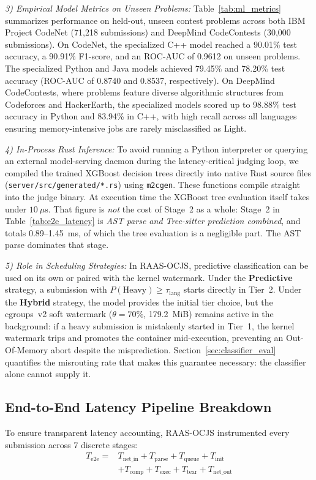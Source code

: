 \documentclass[conference]{IEEEtran}
\begin{document}
\textit{3) Empirical Model Metrics on Unseen Problems:}
Table~\ref{tab:ml_metrics} summarizes performance on held-out, unseen contest problems across both IBM Project CodeNet (71,218 submissions) and DeepMind CodeContests (30,000 submissions). On CodeNet, the specialized C++ model reached a 90.01\% test accuracy, a 90.91\% F1-score, and an ROC-AUC of 0.9612 on unseen problems. The specialized Python and Java models achieved 79.45\% and 78.20\% test accuracy (ROC-AUC of 0.8740 and 0.8537, respectively). On DeepMind CodeContests, where problems feature diverse algorithmic structures from Codeforces and HackerEarth, the specialized models scored up to 98.88\% test accuracy in Python and 83.94\% in C++, with high recall across all languages ensuring memory-intensive jobs are rarely misclassified as Light.

\textit{4) In-Process Rust Inference:}
To avoid running a Python interpreter or querying an external model-serving daemon during the latency-critical judging loop, we compiled the trained XGBoost decision trees directly into native Rust source files (\texttt{server/src/generated/*.rs}) using \texttt{m2cgen}. These functions compile straight into the judge binary. At execution time the XGBoost tree evaluation itself takes under $10\ \mu\text{s}$. That figure is \emph{not} the cost of Stage~2 as a whole: Stage~2 in Table~\ref{tab:e2e_latency} is \emph{AST parse and Tree-sitter prediction combined}, and totals 0.89--1.45~ms, of which the tree evaluation is a negligible part. The AST parse dominates that stage.

\textit{5) Role in Scheduling Strategies:}
In RAAS-OCJS, predictive classification can be used on its own or paired with the kernel watermark. Under the \textbf{Predictive} strategy, a submission with $P(\mathrm{Heavy}) \ge \tau_{\mathrm{lang}}$ starts directly in Tier~2. Under the \textbf{Hybrid} strategy, the model provides the initial tier choice, but the cgroups~v2 soft watermark ($\theta = 70\%$, 179.2~MiB) remains active in the background: if a heavy submission is mistakenly started in Tier~1, the kernel watermark trips and promotes the container mid-execution, preventing an Out-Of-Memory abort despite the misprediction. Section~\ref{sec:classifier_eval} quantifies the misrouting rate that makes this guarantee necessary: the classifier alone cannot supply it.

\subsection{End-to-End Latency Pipeline Breakdown}
To ensure transparent latency accounting, RAAS-OCJS instrumented every submission across 7 discrete stages:
\begin{equation}
\begin{aligned}
T_{\mathrm{e2e}} ={}&
T_{\mathrm{net\_in}} + T_{\mathrm{parse}} +
T_{\mathrm{queue}} + T_{\mathrm{init}} \\
&+ T_{\mathrm{comp}} + T_{\mathrm{exec}} +
T_{\mathrm{tear}} + T_{\mathrm{net\_out}}
\end{aligned}
\end{equation}
\end{document}
